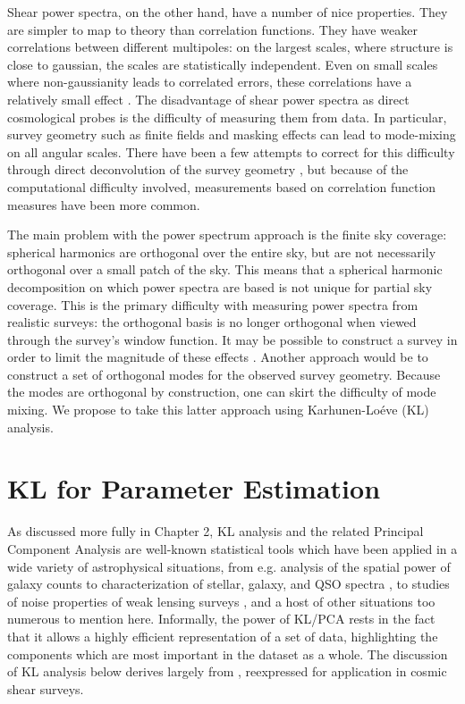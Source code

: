 Shear power spectra, on the other hand, have a number of nice properties.
They are simpler to map to theory than correlation functions.  They have
weaker correlations between different multipoles: on the largest scales,
where structure is close to gaussian, the scales are statistically independent.
Even on small scales where non-gaussianity leads to correlated errors,
these correlations have a relatively small effect \citep{Takada09}.
The disadvantage of shear power spectra as direct cosmological probes is
the difficulty of measuring them from data.  In particular, survey geometry
such as finite fields and masking effects can lead to mode-mixing on all
angular scales.  There have been a few attempts to correct for this
difficulty through direct deconvolution of the survey geometry
\citep{Brown03, Hikage11}, but because of the computational difficulty
involved, measurements based on correlation function measures have been
more common.

The main problem with the power spectrum approach is the finite sky coverage:
spherical harmonics are orthogonal over the entire sky, but are not
necessarily orthogonal over a small patch of the sky.  This means that a
spherical harmonic decomposition on which power spectra are based is not
unique for partial sky coverage.  This is the primary difficulty with
measuring power spectra from realistic surveys: the orthogonal basis is no
longer orthogonal when viewed through the survey's window function.
It may be possible to construct a survey in order to
limit the magnitude of these effects
\citep[see][for some approaches]{Kilbinger04, Kilbinger06}.
Another approach would be to construct a set of orthogonal modes for the
observed survey geometry.  Because the modes are orthogonal by construction,
one can skirt the difficulty of mode mixing.  We propose to take this latter
approach using Karhunen-Lo\'{e}ve (KL) analysis.

\section{KL for Parameter Estimation}
\label{sec:kl_intro}
As discussed more fully in Chapter 2,
KL analysis and the related Principal Component Analysis are well-known
statistical tools which have been applied in a wide variety of astrophysical
situations, from e.g. analysis of the spatial power of galaxy counts
\citep{Vogeley96, Szalay03, Pope04}
to characterization of stellar, galaxy, and QSO spectra
\citep{Connolly95, Connolly99, Yip04a, Yip04b},
to studies of noise properties of weak lensing surveys
\citep{Kilbinger06, Munshi06}, and a host of other situations too numerous
to mention here.  Informally, the power of KL/PCA rests in the fact that 
it allows a highly efficient representation of a set of data, highlighting
the components which are most important in the dataset as a whole.
The discussion of KL analysis below derives largely from \citet{Vogeley96},
reexpressed for application in cosmic shear surveys.

